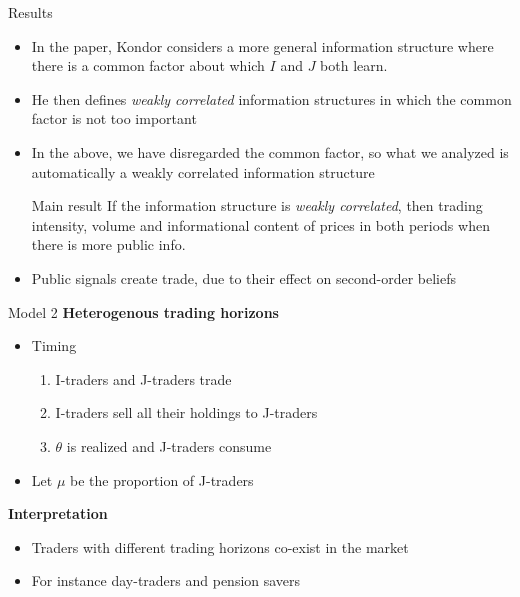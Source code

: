 \documentclass[english,10pt
,aspectratio=169
]{beamer}
\begin{document}
\begin{frame}{Results}
	\begin{itemize}
		\item In the paper, Kondor considers a more general information structure where there is a common factor about which $I$ and $J$ both learn.
		\item He then defines \textit{weakly correlated} information structures in which the common factor  is not too important
		\item In the above, we have disregarded the common factor, so what we analyzed is automatically a weakly correlated information structure
		\begin{block}{Main result}
			If the information structure is \textit{weakly correlated}, then trading intensity, volume and informational content of prices  in both periods when there is more public info.
		\end{block}
		\item Public signals  create trade, due to their effect on second-order beliefs
	\end{itemize}
\end{frame}


\begin{frame}{Model 2}
	\textbf{Heterogenous trading horizons}
	\begin{itemize}
		\item Timing
		\begin{enumerate}
			\item I-traders and J-traders trade
			\item I-traders sell all their holdings to J-traders
			\item $\theta$ is realized and J-traders consume
		\end{enumerate}
		\item Let $\mu$ be the proportion of J-traders
	\end{itemize}
	\textbf{Interpretation}
	\begin{itemize}
		\item Traders with different trading horizons co-exist in the market
		\item For instance day-traders and pension savers
	\end{itemize}
\end{frame}
\end{document}
